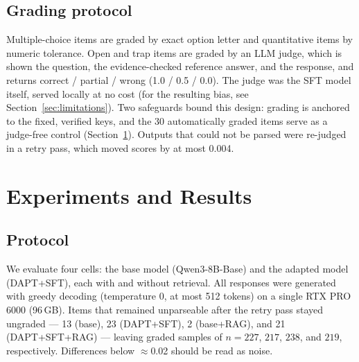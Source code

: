\documentclass[11pt]{article}
\begin{document}
\subsection{Grading protocol}
\label{sec:grading}

Multiple-choice items are graded by exact option letter and
quantitative items by numeric tolerance. Open and trap items are
graded by an LLM judge, which is shown the question, the
evidence-checked reference answer, and the response, and returns
correct / partial / wrong (1.0 / 0.5 / 0.0). The judge was the SFT
model itself, served locally at no cost (for the resulting bias, see
Section~\ref{sec:limitations}). Two safeguards bound this design:
grading is anchored to the fixed, verified keys, and the 30
automatically graded items serve as a judge-free control
(Section~\ref{sec:experiments}). Outputs that could not be parsed
were re-judged in a retry pass, which moved scores by at most 0.004.

\section{Experiments and Results}
\label{sec:experiments}

\subsection{Protocol}

We evaluate four cells: the base model (Qwen3-8B-Base) and the adapted
model (DAPT+SFT), each with and without retrieval. All responses were
generated with greedy decoding (temperature 0, at most 512 tokens) on
a single RTX PRO 6000 (96\,GB). Items that remained unparseable after
the retry pass stayed ungraded --- 13 (base), 23 (DAPT+SFT), 2
(base+RAG), and 21 (DAPT+SFT+RAG) --- leaving graded samples of $n =
227$, $217$, $238$, and $219$, respectively. Differences below
$\approx$0.02 should be read as noise.
\end{document}
